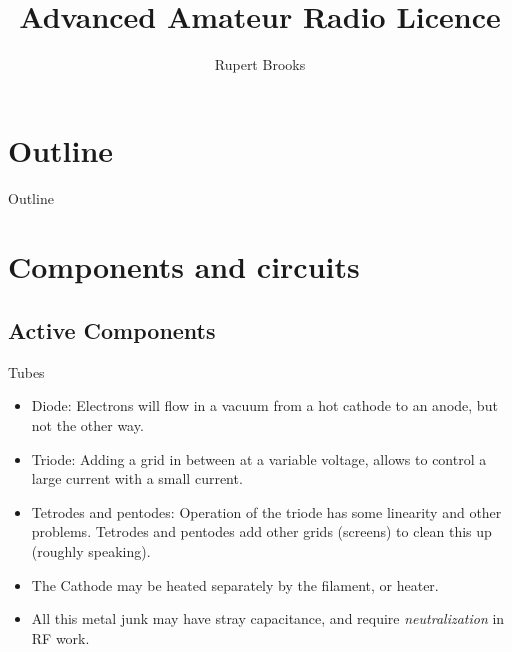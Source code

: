 \documentclass{beamer}
\title{Advanced Amateur Radio Licence}
\author{Rupert Brooks}
\begin{document}
\begin{frame}
\maketitle
\end{frame}



\section*{Outline}

\begin{frame}{Outline}{}
\tableofcontents
\end{frame}
\section{Components and circuits}

\subsection{Active Components}
\begin{frame}{Tubes}{}
\begin{itemize}
\item Diode: Electrons will flow in a vacuum from a hot cathode to an anode, but not the other way.
\item Triode: Adding a grid in between at a variable voltage, allows to control a large current with
a small current.
\item Tetrodes and pentodes: Operation of the triode has some linearity and other problems. Tetrodes and pentodes add other grids (screens) to clean this up (roughly speaking).
\item The Cathode may be heated separately by the filament, or heater.
\item All this metal junk may have stray capacitance, and require {\em neutralization} in RF work.
\end{itemize}
\end{frame}
\end{document}
